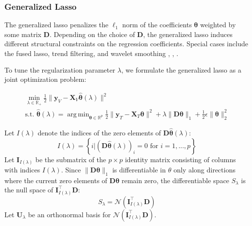 \documentclass[12pt,letterpaper]{article}
\DeclareMathOperator*{\argmin}{arg\,min}
\begin{document}
\subsubsection{Generalized Lasso}
The generalized lasso \citep{roth2004generalized} penalizes the $\ell_1$ norm of the coefficients $\boldsymbol \theta$ weighted by some matrix $\boldsymbol D$. Depending on the choice of $\boldsymbol D$, the generalized lasso induces different structural constraints on the regression coefficients. Special cases include the fused lasso, trend filtering, and wavelet smoothing \citep{tibshirani2005sparsity}, \citep{kim2009ell_1}, \citep{donoho1994ideal}.

To tune the regularization parameter $\lambda$, we formulate the generalized lasso as a joint optimization problem:

\begin{equation}
\begin{array}{c}
\min_{\lambda \in \mathbb{R}_{+}} \frac{1}{2} \| \boldsymbol{y}_V - \boldsymbol{X}_V \hat{\boldsymbol{\theta}} (\lambda) \| ^2 \\
\text{s.t. }
\hat{\boldsymbol{\theta}} (\lambda) =
\argmin_{\boldsymbol{\theta} \in \mathbb{R}^p}
\frac{1}{2} \| \boldsymbol{y}_T - \boldsymbol{X}_T \boldsymbol{\theta} \| ^2
+ \lambda \| \boldsymbol D \boldsymbol{\theta} \|_1
+ \frac{1}{2} \epsilon \| \boldsymbol{\theta} \|_2^2
\end{array}
\label{genlasso}
\end{equation}

Let $I(\lambda)$ denote the indices of the zero elements of $\boldsymbol D \hat{\boldsymbol{\theta}}(\lambda)$:
\begin{equation}
I(\lambda) = \left \{i | (\boldsymbol D \hat{\boldsymbol{\theta}}(\lambda))_i = 0  \text{ for } i=1,...,p \right \}
\end{equation}
Let $\boldsymbol I_{I(\lambda)}$ be the submatrix of the $p \times p$ identity matrix consisting of columns with indices $I(\lambda)$. Since $\|\boldsymbol D \boldsymbol{\theta}\|_1$ is differentiable in $\theta$ only along directions where the current zero elements of $\boldsymbol D \boldsymbol{\theta}$ remain zero, the differentiable space $S_\lambda$ is the null space of $\boldsymbol I_{I(\lambda)}^\top \boldsymbol D$:
\begin{equation}
S_\lambda = \mathcal{N}(\boldsymbol I_{I(\lambda)}^\top \boldsymbol D)
\end{equation}
Let $\boldsymbol U_\lambda$ be an orthonormal basis for $\mathcal{N}(\boldsymbol I_{I(\lambda)}^\top \boldsymbol D)$.
\end{document}
